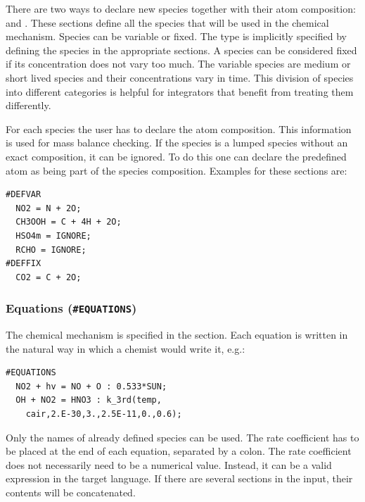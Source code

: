 \documentclass[twoside]{article}
\begin{document}
There are two ways to declare new species together with their atom
composition:  and . These sections define
all the species that will be used in the chemical mechanism. Species can
be variable or fixed. The type is implicitly specified by defining the
species in the appropriate sections. A species can be considered fixed
if its concentration does not vary too much. The variable species are
medium or short lived species and their concentrations vary in time.
This division of species into different categories is helpful for
integrators that benefit from treating them differently.

For each species the user has to declare the atom composition. This
information is used for mass balance checking. If the species is a
lumped species without an exact composition, it can be ignored. To do
this one can declare the predefined atom  as being part of
the species composition. Examples for these sections are:
%
\begin{verbatim}
#DEFVAR
  NO2 = N + 2O;
  CH3OOH = C + 4H + 2O;
  HSO4m = IGNORE;
  RCHO = IGNORE;
#DEFFIX
  CO2 = C + 2O;
\end{verbatim}

\subsubsection{Equations ({\tt\#EQUATIONS})}
\label{sec:section-equations}

The chemical mechanism is specified in the  section.
Each equation is written in the natural way in which a chemist would
write it, e.g.:
%
\begin{verbatim}
#EQUATIONS
  NO2 + hv = NO + O : 0.533*SUN;
  OH + NO2 = HNO3 : k_3rd(temp,
    cair,2.E-30,3.,2.5E-11,0.,0.6);
\end{verbatim}
%
Only the names of already defined species can be used. The rate
coefficient has to be placed at the end of each equation, separated by a
colon. The rate coefficient does not necessarily need to be a numerical
value. Instead, it can be a valid expression in the target language. If
there are several  sections in the input, their
contents will be concatenated. 
\end{document}
